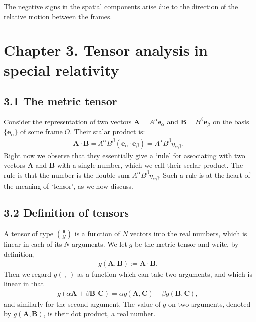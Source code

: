 \documentclass[11pt,letterpaper]{book}
\begin{document}
            The negative signs in the spatial components arise due to the direction of the relative motion between the frames.
           

\section{Chapter 3. Tensor analysis in special relativity}

    \subsection{3.1 The metric tensor}
        Consider the representation of two vectors $\mathbf{A} = A^\alpha \mathbf{e}_\alpha$ and $\mathbf{B} = B^\beta \mathbf{e}_\beta$ on the basis $\{ \mathbf{e}_\alpha \}$ of some frame $O$. Their scalar product is:
        \begin{align}
        \mathbf{A} \cdot \mathbf{B} = A^\alpha B^\beta (\mathbf{e}_\alpha \cdot \mathbf{e}_\beta) = A^\alpha B^\beta \eta_{\alpha\beta}. \tag{3.1}
        \end{align}
        Right now we observe that they essentially give a ‘rule’ for associating with two vectors $\mathbf{A}$ and $\mathbf{B}$ with a single number, which we call their scalar product. The rule is that the number is the double sum $A^\alpha B^\beta \eta_{\alpha\beta}$. Such a rule is at the heart of the meaning of ‘tensor’, as we now discuss.

    \subsection{3.2 Definition of tensors}
        A tensor of type $\binom{0}{N}$ is a function of $N$ vectors into the real numbers, which is linear in each of its $N$ arguments.
        We let $g$ be the metric tensor and write, by definition,
        \begin{align}
        g(\mathbf{A}, \mathbf{B}) := \mathbf{A} \cdot \mathbf{B}. \tag{3.3}
        \end{align}
        Then we regard $g(\ ,\ )$ as a function which can take two arguments, and which is linear in that
        \begin{align}
        g(\alpha \mathbf{A} + \beta \mathbf{B}, \mathbf{C}) = \alpha g(\mathbf{A}, \mathbf{C}) + \beta g(\mathbf{B}, \mathbf{C}), \tag{3.4}
        \end{align}
        and similarly for the second argument. The value of $g$ on two arguments, denoted by $g(\mathbf{A}, \mathbf{B})$, is their dot product, a real number. 
\end{document}
